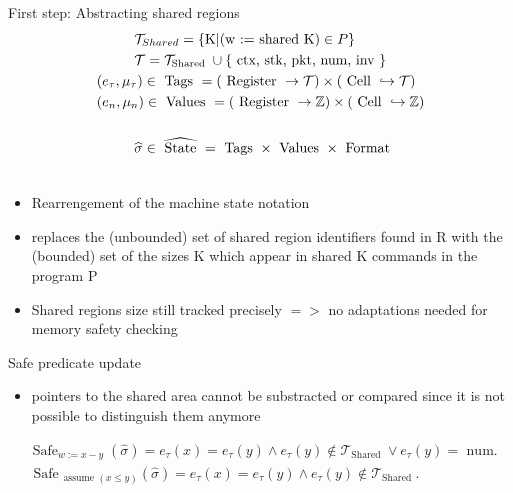 \documentclass[aspectratio=169]{beamer}
\begin{document}
\begin{frame}{First step: Abstracting shared regions}
  $$
    \begin{aligned}
       & \hspace{1cm} \mathcal{T}_{Shared} = \{\text{K} | \text{(w := shared  K)} \in P \}                                                                 \\
       & \hspace{1cm} \mathcal{T}=\mathcal{T}_{\text {Shared }} \cup\{\text { ctx, stk, pkt, num, inv }\}                                                  \\
       & \left(e_\tau, \mu_\tau\right) \in \text { Tags } =(\text { Register } \rightarrow \mathcal{T}) \times(\text { Cell } \hookrightarrow \mathcal{T}) \\
       & \left(e_n, \mu_n\right) \in \text { Values }=(\text { Register } \rightarrow \mathbb{Z}) \times(\text { Cell } \hookrightarrow \mathbb{Z})        \\
       &                                                                                                                                                   \\
       & \vspace{1cm} \hspace{1cm} \widehat{\sigma} \in \widehat{\text { State }}=\text { Tags } \times \text { Values } \times \text { Format }           \\
       &
    \end{aligned}
  $$

  \begin{itemize}
    \item Rearrengement of the machine state notation
    \item replaces the (unbounded) set of shared region
          identifiers found in R with the (bounded) set of the sizes K
          which appear in shared K commands in the program P
    \item Shared regions size still tracked precisely $=>$ no adaptations needed for memory safety checking
  \end{itemize}
\end{frame}

\begin{frame}{Safe predicate update}
  \begin{itemize}
    \item pointers to the shared area cannot be substracted or compared
          since it is not possible to distinguish them anymore
  \end{itemize}

  $$
    \begin{aligned}
       & \operatorname{Safe}_{w:=x-y}(\widehat{\sigma})=  e_\tau(x)=e_\tau(y) \wedge e_\tau(y) \notin \mathcal{T}_{\text {Shared }}  \vee e_\tau(y)=\text { num. } \\
       & \text { Safe }_{\text {assume }(x \leq y)}(\widehat{\sigma})=  e_\tau(x)=e_\tau(y) \wedge e_\tau(y) \notin \mathcal{T}_{\text {Shared }} .                \\
    \end{aligned}
  $$
\end{frame}
\end{document}
